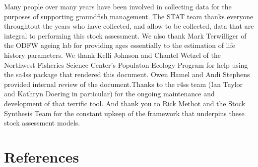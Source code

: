 \documentclass[11pt,
  english,
  a4paper,
]{article}
\begin{document}
\leavevmode\tagmcend\tagstructend


Many people over many years have been involved in collecting data for the purposes of supporting groundfish management. The STAT team thanks everyone throughtout the years who have collected, and allow to be collected, data that are integral to performing this stock assessment. We also thank Mark Terwilliger of the ODFW ageing lab for providing ages essentially to the estimation of life history parameters. We thank Kelli Johnson and Chantel Wetzel of the Northwest Fisheries Science Center's Populaton Ecology Program for help using the sa4ss package that rendered this document. Owen Hamel and Andi Stephens provided internal review of the document.Thanks to the r4ss team (Ian Taylor and Kathryn Doering in particular) for the ongoing maintenance and development of that terrific tool. And thank you to Rick Methot and the Stock Synthesis Team for the constant upkeep of the framework that underpins these stock assessment models.

\leavevmode\tagmcend\tagstructend\par

\clearpage


\hypertarget{references}{%
\section{References}\label{references}}

\leavevmode\tagmcend\tagstructend

\end{document}
